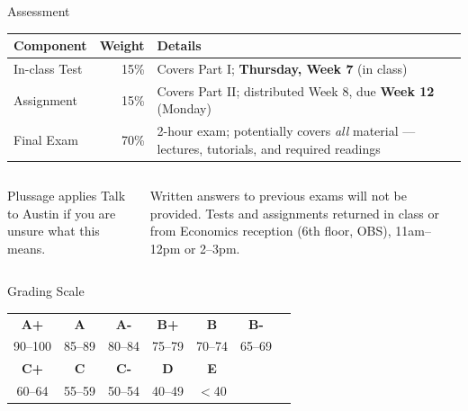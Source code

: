 \documentclass[aspectratio=169, 12pt]{beamer}
\begin{document}
\begin{frame}{Assessment}
  \begin{center}
    \begin{tabular}{@{}lrp{6.5cm}@{}}
      \toprule
      \textbf{Component} & \textbf{Weight} & \textbf{Details} \\
      \midrule
      In-class Test & 15\% & Covers Part I; \textbf{Thursday, Week 7} (in class) \\[0.4em]
      Assignment    & 15\% & Covers Part II; distributed Week 8,
                              due \textbf{Week 12} (Monday) \\[0.4em]
      Final Exam    & 70\% & 2-hour exam; potentially covers \emph{all} material ---
                              lectures, tutorials, and required readings \\
      \bottomrule
    \end{tabular}
  \end{center}
  \vspace{0.5em}
  \begin{columns}
      \begin{alertblock}{Plussage applies}
        Talk to Austin if you are unsure what this means.
      \end{alertblock}
      {\footnotesize Written answers to previous exams will not be provided. Tests and assignments
      returned in class or from Economics reception (6th floor, OBS), 11am--12pm or 2--3pm.}
  \end{columns}
\end{frame}

\begin{frame}{Grading Scale}
  \begin{center}
    \begin{tabular}{@{}ccccccc@{}}
      \toprule
      \textbf{A+} & \textbf{A} & \textbf{A-} &
      \textbf{B+} & \textbf{B} & \textbf{B-} & \\
      90--100 & 85--89 & 80--84 & 75--79 & 70--74 & 65--69 & \\
      \midrule
      \textbf{C+} & \textbf{C} & \textbf{C-} &
      \textbf{D} & \textbf{E} & & \\
      60--64 & 55--59 & 50--54 & 40--49 & $<$40 & & \\
      \bottomrule
    \end{tabular}
  \end{center}
\end{frame}
\end{document}
